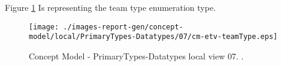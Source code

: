 Figure \ref{fig:lu.uni.lassy.excalibur.group09.spec-CM-view-local-PrimaryTypes-Datatypes-07} Is representing the team type enumeration type.



\begin{figure}[htbp] 
\label{fig:lu.uni.lassy.excalibur.group09.spec-CM}
\begin{center}
\texttt{[image: ./images-report-gen/concept-model/local/PrimaryTypes-Datatypes/07/cm-etv-teamType.eps]}
\end{center}
\caption[Concept Model - PrimaryTypes-Datatypes local view 07 - ]{Concept Model - PrimaryTypes-Datatypes local view 07. .}
\label{fig:lu.uni.lassy.excalibur.group09.spec-CM-view-local-PrimaryTypes-Datatypes-07}
\end{figure}
\vspace{0.5cm} 
